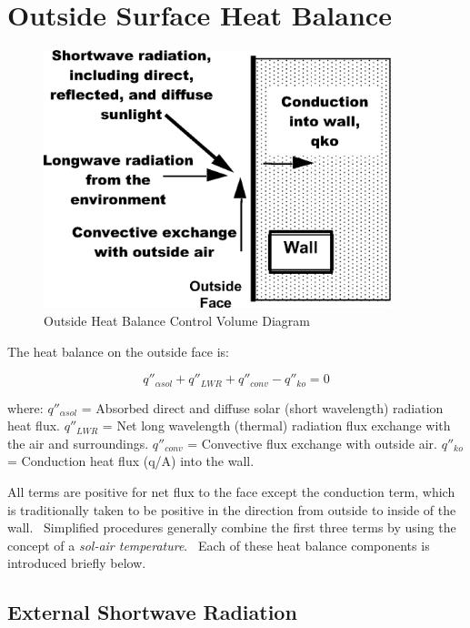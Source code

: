 \section{Outside Surface Heat Balance}\label{outside-surface-heat-balance}

\begin{figure}[hbtp] %
\centering
\includegraphics[width=0.9\textwidth, height=0.9\textheight, keepaspectratio=true]{media/image242.png}
\caption{Outside Heat Balance Control Volume Diagram \protect \label{fig:outside-heat-balance-control-volume-diagram}}
\end{figure}

The heat balance on the outside face is:

\begin{equation}
{q''_{\alpha sol}} + {q''_{LWR}} + {q''_{conv}} - {q''_{ko}} = 0
\end{equation}

where:
\(q''_{\alpha sol}\) = Absorbed direct and diffuse solar (short wavelength) radiation heat flux.
\(q''_{LWR}\) = Net long wavelength (thermal) radiation flux exchange with the air and surroundings.
\(q''_{conv}\) = Convective flux exchange with outside air.
\(q''_{ko}\) = Conduction heat flux (q/A) into the wall.

All terms are positive for net flux to the face except the conduction term, which is traditionally taken to be positive in the direction from outside to inside of the wall.~ Simplified procedures generally combine the first three terms by using the concept of a \emph{sol-air temperature}.~ Each of these heat balance components is introduced briefly below.

\subsection{External Shortwave Radiation}\label{external-shortwave-radiation}

